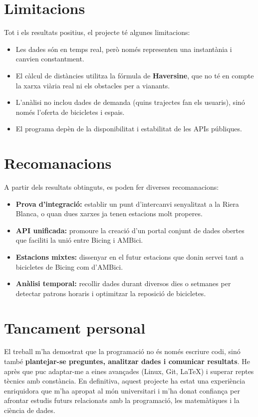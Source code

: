 \section{Limitacions}
\label{s:recomanacions}
Tot i els resultats positius, el projecte té algunes limitacions:
\begin{itemize}
    \item Les dades són en temps real, però només representen una instantània i canvien constantment.
    \item El càlcul de distàncies utilitza la fórmula de \textbf{Haversine}, que no té en compte la xarxa viària real ni els obstacles per a vianants.
    \item L’anàlisi no inclou dades de demanda (quins trajectes fan els usuaris), sinó només l’oferta de bicicletes i espais.
    \item El programa depèn de la disponibilitat i estabilitat de les APIs públiques.
\end{itemize}

\section{Recomanacions}
A partir dels resultats obtinguts, es poden fer diverses recomanacions:
\begin{itemize}
    \item \textbf{Prova d’integració:} establir un punt d’intercanvi senyalitzat a la Riera Blanca, o quan dues xarxes ja tenen estacions molt properes.
    \item \textbf{API unificada:} promoure la creació d’un portal conjunt de dades obertes que faciliti la unió entre Bicing i AMBici.
    \item \textbf{Estacions mixtes:} dissenyar en el futur estacions que donin servei tant a bicicletes de Bicing com d’AMBici.
    \item \textbf{Anàlisi temporal:} recollir dades durant diversos dies o setmanes per detectar patrons horaris i optimitzar la reposició de bicicletes.
\end{itemize}

\section{Tancament personal}
El treball m’ha demostrat que la programació no és només escriure codi, sinó també \textbf{plantejar-se preguntes, analitzar dades i comunicar resultats}.
He après que puc adaptar-me a eines avançades (Linux, Git, LaTeX) i superar reptes tècnics amb constància.
En definitiva, aquest projecte ha estat una experiència enriquidora que m’ha apropat al món universitari i m’ha donat confiança per afrontar estudis futurs relacionats amb la programació, les matemàtiques i la ciència de dades.

